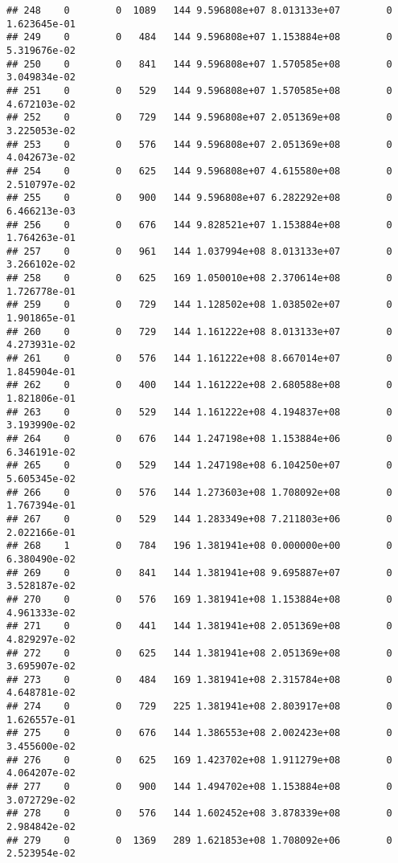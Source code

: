 \documentclass[
]{article}
\begin{document}
\begin{enumerate}
\begin{verbatim}
## 248    0        0  1089   144 9.596808e+07 8.013133e+07        0  1.623645e-01
## 249    0        0   484   144 9.596808e+07 1.153884e+08        0  5.319676e-02
## 250    0        0   841   144 9.596808e+07 1.570585e+08        0  3.049834e-02
## 251    0        0   529   144 9.596808e+07 1.570585e+08        0  4.672103e-02
## 252    0        0   729   144 9.596808e+07 2.051369e+08        0  3.225053e-02
## 253    0        0   576   144 9.596808e+07 2.051369e+08        0  4.042673e-02
## 254    0        0   625   144 9.596808e+07 4.615580e+08        0  2.510797e-02
## 255    0        0   900   144 9.596808e+07 6.282292e+08        0  6.466213e-03
## 256    0        0   676   144 9.828521e+07 1.153884e+08        0  1.764263e-01
## 257    0        0   961   144 1.037994e+08 8.013133e+07        0  3.266102e-02
## 258    0        0   625   169 1.050010e+08 2.370614e+08        0  1.726778e-01
## 259    0        0   729   144 1.128502e+08 1.038502e+07        0  1.901865e-01
## 260    0        0   729   144 1.161222e+08 8.013133e+07        0  4.273931e-02
## 261    0        0   576   144 1.161222e+08 8.667014e+07        0  1.845904e-01
## 262    0        0   400   144 1.161222e+08 2.680588e+08        0  1.821806e-01
## 263    0        0   529   144 1.161222e+08 4.194837e+08        0  3.193990e-02
## 264    0        0   676   144 1.247198e+08 1.153884e+06        0  6.346191e-02
## 265    0        0   529   144 1.247198e+08 6.104250e+07        0  5.605345e-02
## 266    0        0   576   144 1.273603e+08 1.708092e+08        0  1.767394e-01
## 267    0        0   529   144 1.283349e+08 7.211803e+06        0  2.022166e-01
## 268    1        0   784   196 1.381941e+08 0.000000e+00        0  6.380490e-02
## 269    0        0   841   144 1.381941e+08 9.695887e+07        0  3.528187e-02
## 270    0        0   576   169 1.381941e+08 1.153884e+08        0  4.961333e-02
## 271    0        0   441   144 1.381941e+08 2.051369e+08        0  4.829297e-02
## 272    0        0   625   144 1.381941e+08 2.051369e+08        0  3.695907e-02
## 273    0        0   484   169 1.381941e+08 2.315784e+08        0  4.648781e-02
## 274    0        0   729   225 1.381941e+08 2.803917e+08        0  1.626557e-01
## 275    0        0   676   144 1.386553e+08 2.002423e+08        0  3.455600e-02
## 276    0        0   625   169 1.423702e+08 1.911279e+08        0  4.064207e-02
## 277    0        0   900   144 1.494702e+08 1.153884e+08        0  3.072729e-02
## 278    0        0   576   144 1.602452e+08 3.878339e+08        0  2.984842e-02
## 279    0        0  1369   289 1.621853e+08 1.708092e+06        0  2.523954e-02

\end{verbatim}
\end{enumerate}
\end{document}
